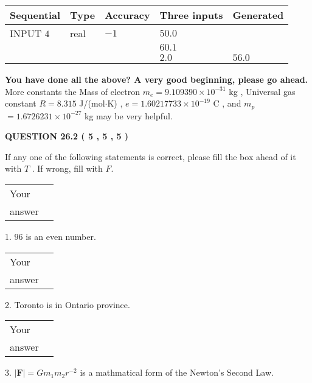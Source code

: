 \documentclass[12pt]{article}
\begin{document}
   
  
  
\noindent\begin{tabular}{|l|l|l|l|l|}
\hline
 Sequential & Type & Accuracy & Three inputs & Generated \\ 
\hline
 
 
  INPUT $            4 $ & real & $           -1  $ & $
 50.0
  $ & \\
  & & &  $
 60.1
  $ & \\
  & & &  $
 2.0
 $ & $ 56.0 $ 
 \\  \hline  
 \end{tabular}
   
   
   
   
\vspace{0.3in}
{\textbf{\LARGE{You have done all the above? A very good beginning, please go ahead.}}}
More constants the
Mass of electron
$m_e$$ =
9.109390 \times 10^{-31} $
kg
,
Universal gas constant
$R$$ =
8.315 $
J/(mol$\cdot $K)
,
$e$$ =
1.60217733 \times 10^{-19} $
C
, and
$m_p$$ =
1.6726231 \times 10^{-27} $
kg
%
may be very helpful.
\vspace{0.3in}
   
   
  
\vspace{0.2in}
  
{\textbf{\Large{QUESTION
26.2 
 (           5 ,           5 ,           5 )
}}}
  
  
If any one of the following statements is correct, please fill the box ahead of it with $T$ .
If wrong, fill with $F$.
 
\noindent\begin{tabular}{|l|l|}\hline Your&\hspace{.2in} \\ answer&\hspace{.2in} \\ \hline \end{tabular}
1. $ %
96$ is an  %
even number.
 
\noindent\begin{tabular}{|l|l|}\hline Your&\hspace{.2in} \\ answer&\hspace{.2in} \\ \hline \end{tabular}
2.  %
Toronto is in  %
Ontario province.
 
\noindent\begin{tabular}{|l|l|}\hline Your&\hspace{.2in} \\ answer&\hspace{.2in} \\ \hline \end{tabular}
3.  %
$\left| \mathbf{F}\right| =Gm_1m_2r^{-2}$ is a mathmatical form of
the Newton's Second Law.
 
\end{document}
